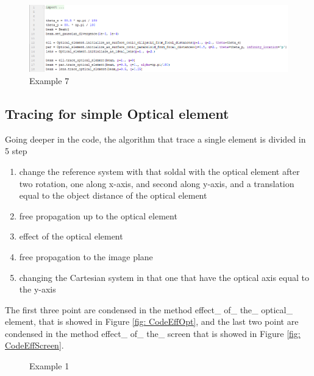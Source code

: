 \begin{figure}[H]
%
\centering
%
\includegraphics[width=1.\textwidth]{Immagini/Chapter3/CodeSystem}
%
\caption{Example 7}
%
\label{fig: CodeSystem}
%
\end{figure}
%
\subsection{Tracing for simple Optical element}
Going deeper in the code, the algorithm that trace a single element is divided in 5 step
\begin{enumerate}
	\item change the reference system with that soldal with the optical element after two rotation, one along x-axis, and second along y-axis, and a translation equal to the object distance of the optical element
	\item free propagation up to the optical element
	\item effect of the optical element
	\item free propagation to the image plane
	\item changing the Cartesian system in that one that have the optical axis equal to the y-axis
\end{enumerate}
The first three point are condensed in the method effect\_ of\_ the\_ optical\_ element, that is showed in Figure \ref{fig: CodeEffOpt}, and the last two point are condensed in the method effect\_ of\_ the\_ screen that is showed in Figure \ref{fig: CodeEffScreen}.
\begin{figure}[H]
%
\centering
%
\quad
%
%
\caption{Example 1}
\label{fig :p1}
%
\end{figure}
